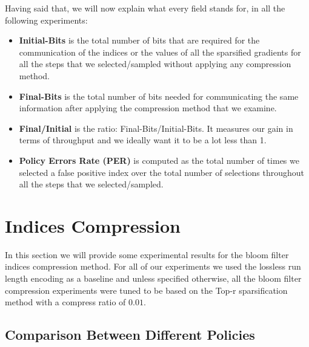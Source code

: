     Having said that, we will now explain what every field stands for, in all the following experiments:
    \begin{itemize}
        \item {\bf Initial-Bits} is the total number of bits that are required for the communication of the indices or the values of all the sparsified gradients for all the steps that we selected/sampled without applying any compression method.
        
        \item {\bf Final-Bits} is the total number of bits needed for communicating the same information after applying the compression method that we examine.
        
        \item {\bf Final/Initial} is the ratio: Final-Bits/Initial-Bits. 
        It measures our gain in terms of throughput and we ideally want it to be a lot less than 1.
        
        \item {\bf Policy Errors Rate (PER)} is computed as the total number of times we selected a false positive index over the total number of selections 
        throughout all the steps that we selected/sampled.
    \end{itemize}
    

    
    \newpage
    \section{Indices Compression}
    
    In this section we will provide some experimental results for the bloom filter indices compression method.
    For all of our experiments we used the lossless run length encoding as a baseline and unless specified otherwise, all the bloom filter compression experiments were tuned to be based on the Top-r sparsification method with a compress ratio of $0.01$.
    
    \subsection{Comparison Between Different Policies}

